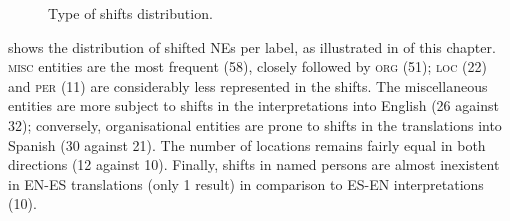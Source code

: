 \documentclass[output=paper]{langscibook}
\begin{document}
\begin{figure}
\caption{
Type of shifts distribution.
}
\label{fig:corpas:6}
\end{figure}

\newpage
{} shows the distribution of shifted NEs per label, as illustrated in  of this chapter. \textsc{misc} entities are the most frequent (58), closely followed by \textsc{org} (51); \textsc{loc} (22) and \textsc{per} (11) are considerably less represented in the shifts. The miscellaneous entities are more subject to shifts in the interpretations into English (26 against 32); conversely, organisational entities are prone to shifts in the translations into Spanish (30 against 21). The number of locations remains fairly equal in both directions (12 against 10). Finally, shifts in named persons are almost inexistent in EN-ES translations (only 1 result) in comparison to ES-EN interpretations (10).
\end{document}
